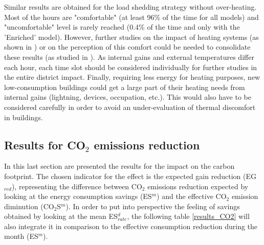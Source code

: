 \documentclass[buildings,article,submit,moreauthors,pdftex,10pt,a4paper]{mdpi}
\theoremstyle{mdpi}
\newcounter{ex}
\newcounter{re}
\theoremstyle{mdpidefinition}
\begin{document}
Similar results are obtained for the load shedding strategy without over-heating. Most of the hours are "comfortable" (at least 96\% of the time for all models) and "uncomfortable" level is rarely reached (0.4\% of the time and only with the 'Enriched' model). However, further studies on the impact of heating systems (as shown in \cite{reynders_potential_2013}) or on the perception of this comfort could be needed to consolidate these results (as studied in \cite{amasuomo_perceived_2016}). As internal gains and external temperatures differ each hour, each time slot should be considered individually for further studies in the entire district impact. Finally, requiring less energy for heating purposes, new low-consumption buildings could get a large part of their heating needs from internal gains (lightning, devices, occupation, etc.). This would also have to be considered carefully in order to avoid an under-evaluation of thermal discomfort in buildings.



\subsection{Results for CO$_2$ emissions reduction}
In this last section are presented the results for the impact on the carbon footprint. The chosen indicator for the effect is the expected gain reduction (EG$_{red}$), representing the difference between CO$_2$ emissions reduction expected by looking at the energy consumption savings (ES$^{m}$) and the effective CO$_2$ emission diminution (CO$_{2}$S$^{m}$). In order to put into perspective the feeling of savings obtained by looking at the mean ES$_{rate}^{d}$, the following table \ref{results_CO2} will also integrate it in comparison to the effective consumption reduction during the month (ES$^{m}$).
\end{document}
